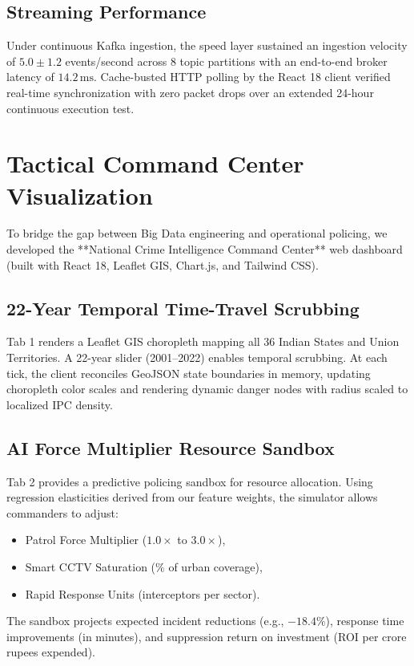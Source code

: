\documentclass[conference]{IEEEtran}
\begin{document}
\subsection{Streaming Performance}
Under continuous Kafka ingestion, the speed layer sustained an ingestion velocity of $5.0 \pm 1.2$ events/second across 8 topic partitions with an end-to-end broker latency of $14.2\,\text{ms}$. Cache-busted HTTP polling by the React 18 client verified real-time synchronization with zero packet drops over an extended 24-hour continuous execution test.

\section{Tactical Command Center Visualization}
To bridge the gap between Big Data engineering and operational policing, we developed the **National Crime Intelligence Command Center** web dashboard (built with React 18, Leaflet GIS, Chart.js, and Tailwind CSS).

\subsection{22-Year Temporal Time-Travel Scrubbing}
Tab 1 renders a Leaflet GIS choropleth mapping all 36 Indian States and Union Territories. A 22-year slider (2001--2022) enables temporal scrubbing. At each tick, the client reconciles GeoJSON state boundaries in memory, updating choropleth color scales and rendering dynamic danger nodes with radius scaled to localized IPC density.

\subsection{AI Force Multiplier Resource Sandbox}
Tab 2 provides a predictive policing sandbox for resource allocation. Using regression elasticities derived from our feature weights, the simulator allows commanders to adjust:
\begin{itemize}
    \item Patrol Force Multiplier ($1.0\times$ to $3.0\times$),
    \item Smart CCTV Saturation ($\%$ of urban coverage),
    \item Rapid Response Units (interceptors per sector).
\end{itemize}
The sandbox projects expected incident reductions (e.g., $-18.4\%$), response time improvements (in minutes), and suppression return on investment (ROI per crore rupees expended).
\end{document}
